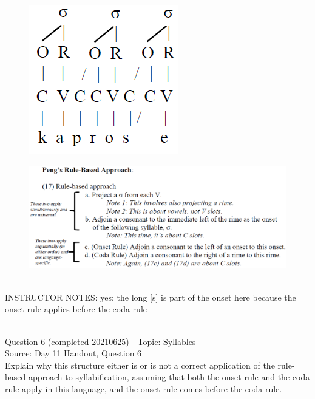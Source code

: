 \documentclass[12pt]{article}
\begin{document}
\begin{figure}[H]
\includegraphics{../images/pengrules_kaprosse_yes.png}
\end{figure}
\begin{figure}[H]
\includegraphics{../images/peng_rules.png}
\end{figure}

~\\
INSTRUCTOR NOTES: yes; the long [s] is part of the onset here because the onset rule applies before the coda rule


~\\

{\large Question 6} (completed 20210625) - Topic: Syllables\\
Source: Day 11 Handout, Question 6\\

Explain why this structure either is or is not a correct application of the rule-based approach to syllabification, assuming that both the onset rule and the coda rule apply in this language, and the onset rule comes before the coda rule.\\
\end{document}

